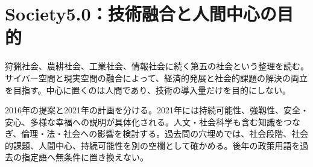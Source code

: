 \section{Society5.0：技術融合と人間中心の目的}
\label{theory:society:five}
狩猟社会、農耕社会、工業社会、情報社会に続く第五の社会という整理を読む。サイバー空間と現実空間の融合によって、経済的発展と社会的課題の解決の両立を目指す。中心に置くのは人間であり、技術の導入量だけを目的にしない\parencite{eth54_society2021}。

2016年の提案と2021年の計画を分ける。2021年には持続可能性、強靱性、安全・安心、多様な幸福への説明が具体化される。人文・社会科学も含む知識をつなぎ、倫理・法・社会への影響を検討する。過去問の穴埋めでは、社会段階、社会的課題、人間中心、持続可能性を別の空欄として確かめる。後年の政策用語を過去の指定語へ無条件に置き換えない。
